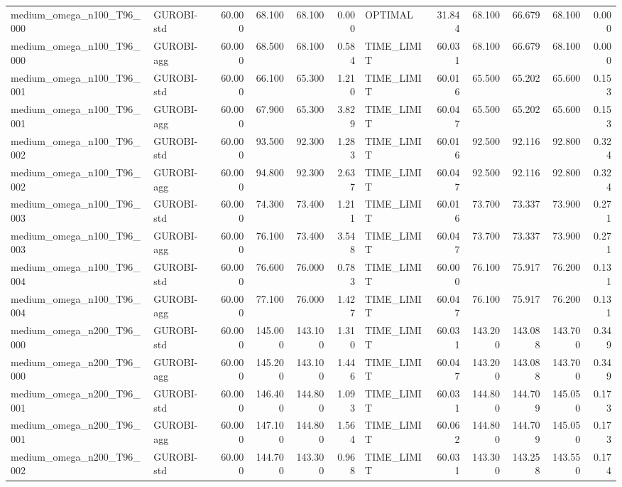\begin{table}[htbp]
\begin{tabular}{llrrrrlrrrrr}
medium\_omega\_n100\_T96\_000 & GUROBI-std & 60.000 & 68.100 & 68.100 & 0.000 & OPTIMAL & 31.844 & 68.100 & 66.679 & 68.100 & 0.000 \\
medium\_omega\_n100\_T96\_000 & GUROBI-agg & 60.000 & 68.500 & 68.100 & 0.584 & TIME\_LIMIT & 60.031 & 68.100 & 66.679 & 68.100 & 0.000 \\
medium\_omega\_n100\_T96\_001 & GUROBI-std & 60.000 & 66.100 & 65.300 & 1.210 & TIME\_LIMIT & 60.016 & 65.500 & 65.202 & 65.600 & 0.153 \\
medium\_omega\_n100\_T96\_001 & GUROBI-agg & 60.000 & 67.900 & 65.300 & 3.829 & TIME\_LIMIT & 60.047 & 65.500 & 65.202 & 65.600 & 0.153 \\
medium\_omega\_n100\_T96\_002 & GUROBI-std & 60.000 & 93.500 & 92.300 & 1.283 & TIME\_LIMIT & 60.016 & 92.500 & 92.116 & 92.800 & 0.324 \\
medium\_omega\_n100\_T96\_002 & GUROBI-agg & 60.000 & 94.800 & 92.300 & 2.637 & TIME\_LIMIT & 60.047 & 92.500 & 92.116 & 92.800 & 0.324 \\
medium\_omega\_n100\_T96\_003 & GUROBI-std & 60.000 & 74.300 & 73.400 & 1.211 & TIME\_LIMIT & 60.016 & 73.700 & 73.337 & 73.900 & 0.271 \\
medium\_omega\_n100\_T96\_003 & GUROBI-agg & 60.000 & 76.100 & 73.400 & 3.548 & TIME\_LIMIT & 60.047 & 73.700 & 73.337 & 73.900 & 0.271 \\
medium\_omega\_n100\_T96\_004 & GUROBI-std & 60.000 & 76.600 & 76.000 & 0.783 & TIME\_LIMIT & 60.000 & 76.100 & 75.917 & 76.200 & 0.131 \\
medium\_omega\_n100\_T96\_004 & GUROBI-agg & 60.000 & 77.100 & 76.000 & 1.427 & TIME\_LIMIT & 60.047 & 76.100 & 75.917 & 76.200 & 0.131 \\
medium\_omega\_n200\_T96\_000 & GUROBI-std & 60.000 & 145.000 & 143.100 & 1.310 & TIME\_LIMIT & 60.031 & 143.200 & 143.088 & 143.700 & 0.349 \\
medium\_omega\_n200\_T96\_000 & GUROBI-agg & 60.000 & 145.200 & 143.100 & 1.446 & TIME\_LIMIT & 60.047 & 143.200 & 143.088 & 143.700 & 0.349 \\
medium\_omega\_n200\_T96\_001 & GUROBI-std & 60.000 & 146.400 & 144.800 & 1.093 & TIME\_LIMIT & 60.031 & 144.800 & 144.709 & 145.050 & 0.173 \\
medium\_omega\_n200\_T96\_001 & GUROBI-agg & 60.000 & 147.100 & 144.800 & 1.564 & TIME\_LIMIT & 60.062 & 144.800 & 144.709 & 145.050 & 0.173 \\
medium\_omega\_n200\_T96\_002 & GUROBI-std & 60.000 & 144.700 & 143.300 & 0.968 & TIME\_LIMIT & 60.031 & 143.300 & 143.258 & 143.550 & 0.174 \\

\end{tabular}
\end{table}

